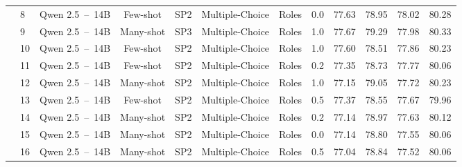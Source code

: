 \begin{table*}[t]
\begin{tabular}{cllccccccccc}
                                    & 8	                & Qwen 2.5~--~14B       & Few-shot      & SP2             & Multiple-Choice         & Roles         & 0.0           & 77.63                 & 78.95             & 78.02                 & 80.28                 \\
                                    & 9	                & Qwen 2.5~--~14B       & Many-shot     & SP3             & Multiple-Choice         & Roles         & 1.0           & 77.67                 & 79.29             & 77.98                 & 80.33                 \\
                                    & 10	            & Qwen 2.5~--~14B       & Few-shot      & SP2             & Multiple-Choice         & Roles         & 1.0           & 77.60                 & 78.51             & 77.86                 & 80.23                 \\
                                    & 11	            & Qwen 2.5~--~14B       & Few-shot      & SP2             & Multiple-Choice         & Roles         & 0.2           & 77.35                 & 78.73             & 77.77                 & 80.06                 \\
                                    & 12	            & Qwen 2.5~--~14B       & Many-shot     & SP2             & Multiple-Choice         & Roles         & 1.0           & 77.15                 & 79.05             & 77.72                 & 80.23                 \\
                                    & 13	            & Qwen 2.5~--~14B       & Few-shot      & SP2             & Multiple-Choice         & Roles         & 0.5           & 77.37                 & 78.55             & 77.67                 & 79.96                 \\
                                    & 14	            & Qwen 2.5~--~14B       & Many-shot     & SP2             & Multiple-Choice         & Roles         & 0.2           & 77.14                 & 78.97             & 77.63                 & 80.12                 \\
                                    & 15	            & Qwen 2.5~--~14B       & Many-shot     & SP2             & Multiple-Choice         & Roles         & 0.0           & 77.14                 & 78.80             & 77.55                 & 80.06                 \\
                                    & 16	            & Qwen 2.5~--~14B       & Many-shot     & SP2             & Multiple-Choice         & Roles         & 0.5           & 77.04                 & 78.84             & 77.52                 & 80.06                 \\

\end{tabular}
\end{table*}
